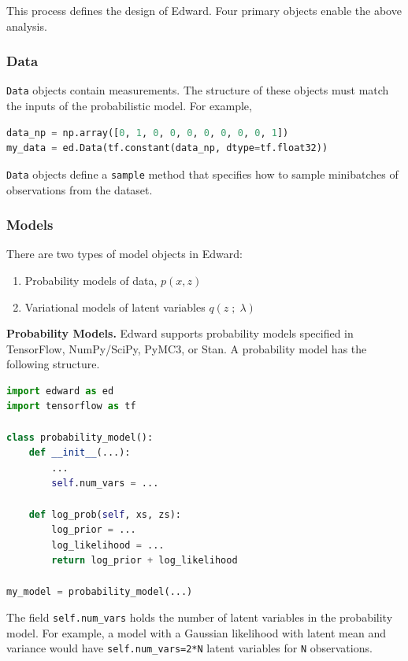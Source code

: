 This process defines the design of Edward. Four primary objects enable the
above analysis. 

\subsubsection{Data}

\texttt{Data} objects contain measurements. The structure of these objects must
match the inputs of the probabilistic model. For example, 

\begin{lstlisting}[language=Python]
data_np = np.array([0, 1, 0, 0, 0, 0, 0, 0, 0, 1])
my_data = ed.Data(tf.constant(data_np, dtype=tf.float32))
\end{lstlisting}

\texttt{Data} objects define a \texttt{sample} method that specifies how to
sample minibatches of observations from the dataset.

\subsubsection{Models}\label{models}

There are two types of model objects in Edward:
\begin{enumerate}
\item Probability models of data, $p(x,z)$
\item Variational models of latent variables $q(z\;;\;\lambda)$
\end{enumerate}

\textbf{Probability Models.}
Edward supports probability models specified in TensorFlow, NumPy/SciPy, PyMC3,
or Stan. A probability model has the following structure.
\begin{lstlisting}[language=Python]
import edward as ed
import tensorflow as tf

class probability_model():
    def __init__(...):
        ...
        self.num_vars = ...
 
    def log_prob(self, xs, zs):
        log_prior = ...
        log_likelihood = ...
        return log_prior + log_likelihood

my_model = probability_model(...)
\end{lstlisting}
The field \texttt{self.num\_vars} holds the number of latent variables in the
probability model. For example, a model with a Gaussian likelihood with latent
mean and variance would have \texttt{self.num\_vars=2*N} latent variables for 
\texttt{N} observations.

